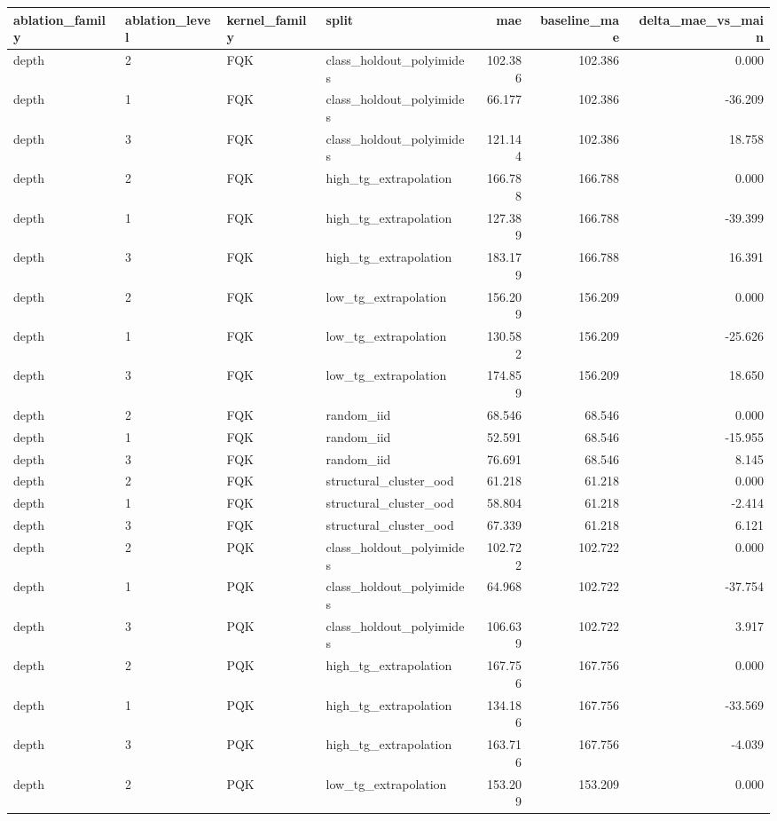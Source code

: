 \begin{tabular}{llllrrr}
\toprule
ablation\_family & ablation\_level & kernel\_family & split & mae & baseline\_mae & delta\_mae\_vs\_main \\
\midrule
depth & 2 & FQK & class\_holdout\_polyimides & 102.386 & 102.386 & 0.000 \\
depth & 1 & FQK & class\_holdout\_polyimides & 66.177 & 102.386 & -36.209 \\
depth & 3 & FQK & class\_holdout\_polyimides & 121.144 & 102.386 & 18.758 \\
depth & 2 & FQK & high\_tg\_extrapolation & 166.788 & 166.788 & 0.000 \\
depth & 1 & FQK & high\_tg\_extrapolation & 127.389 & 166.788 & -39.399 \\
depth & 3 & FQK & high\_tg\_extrapolation & 183.179 & 166.788 & 16.391 \\
depth & 2 & FQK & low\_tg\_extrapolation & 156.209 & 156.209 & 0.000 \\
depth & 1 & FQK & low\_tg\_extrapolation & 130.582 & 156.209 & -25.626 \\
depth & 3 & FQK & low\_tg\_extrapolation & 174.859 & 156.209 & 18.650 \\
depth & 2 & FQK & random\_iid & 68.546 & 68.546 & 0.000 \\
depth & 1 & FQK & random\_iid & 52.591 & 68.546 & -15.955 \\
depth & 3 & FQK & random\_iid & 76.691 & 68.546 & 8.145 \\
depth & 2 & FQK & structural\_cluster\_ood & 61.218 & 61.218 & 0.000 \\
depth & 1 & FQK & structural\_cluster\_ood & 58.804 & 61.218 & -2.414 \\
depth & 3 & FQK & structural\_cluster\_ood & 67.339 & 61.218 & 6.121 \\
depth & 2 & PQK & class\_holdout\_polyimides & 102.722 & 102.722 & 0.000 \\
depth & 1 & PQK & class\_holdout\_polyimides & 64.968 & 102.722 & -37.754 \\
depth & 3 & PQK & class\_holdout\_polyimides & 106.639 & 102.722 & 3.917 \\
depth & 2 & PQK & high\_tg\_extrapolation & 167.756 & 167.756 & 0.000 \\
depth & 1 & PQK & high\_tg\_extrapolation & 134.186 & 167.756 & -33.569 \\
depth & 3 & PQK & high\_tg\_extrapolation & 163.716 & 167.756 & -4.039 \\
depth & 2 & PQK & low\_tg\_extrapolation & 153.209 & 153.209 & 0.000 \\

\end{tabular}
